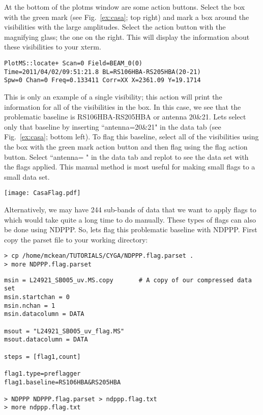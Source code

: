 At the bottom of the plotms window are some action buttons. Select the box with the green mark (see Fig.~\ref{ex:casa}; top right) and mark a box around the visibilities with the large amplitudes. Select the action button with the magnifying glass; the one on the right. This will display the information about these visibilities to your xterm.
\begin{verbatim}
PlotMS::locate+ Scan=0 Field=BEAM_0(0)
Time=2011/04/02/09:51:21.8 BL=RS106HBA-RS205HBA(20-21) 
Spw=0 Chan=0 Freq=0.133411 Corr=XX X=2361.09 Y=19.1714
\end{verbatim}

This is only an example of a single visibility; this action will print the information for all of the visibilities in the box. In this case, we see that the problematic baseline is RS106HBA-RS205HBA or antenna 20\&21. Lets select only that baseline by inserting ``antenna=20\&21" in the data tab (see Fig.~\ref{ex:casa}; bottom left). To flag this baseline, select all of the visibilities using the box with the green mark action button and then flag using the flag action button. Select ``antenna= " in the data tab and replot to see the data set with the flags applied. This manual method is most useful for making small flags to a small data set.
%
%
\begin{figure*}[!ht]
\begin{center}
    \texttt{[image: CasaFlag.pdf]}
  \caption{Top left: Plotting the visibility amplitude against time. Top right: Plotting the visibility amplitude against UV distance and selecting the baseline with an unusually large amplitude. Bottom left: Selecting only the visibilities for the baseline 20\&21 and flagging. Bottom right: The data set without the flagged baseline 20\&21.}
  \label{ex:casa}
  \end{center}
\end{figure*}
%
%
Alternatively, we may have 244 sub-bands of data that we want to apply flags to which would take quite a long time to do manually. These types of flags can also be done using NDPPP. So, lets flag this problematic baseline with NDPPP. First copy the parset file to your working directory:
\begin{verbatim}
> cp /home/mckean/TUTORIALS/CYGA/NDPPP.flag.parset .
> more NDPPP.flag.parset
\end{verbatim}
\begin{lstlisting}
msin = L24921_SB005_uv.MS.copy       # A copy of our compressed data set
msin.startchan = 0
msin.nchan = 1
msin.datacolumn = DATA

msout = "L24921_SB005_uv_flag.MS"      
msout.datacolumn = DATA

steps = [flag1,count]

flag1.type=preflagger
flag1.baseline=RS106HBA&RS205HBA

> NDPPP NDPPP.flag.parset > ndppp.flag.txt
> more ndppp.flag.txt
\end{lstlisting}

